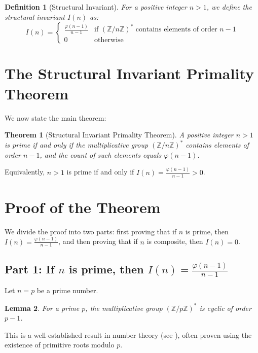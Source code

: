\documentclass[11pt,a4paper]{article}
\newtheorem{theorem}{Theorem}
\newtheorem{lemma}[theorem]{Lemma}
\newtheorem{definition}{Definition}
\newcommand{\Z}{\mathbb{Z}}
\newcommand{\ZnZstar}[1]{(\Z/{#1}\Z)^{*}}
\newcommand{\totient}{\varphi}
\newcommand{\structinv}{I}
\begin{document}
\begin{definition}[Structural Invariant]
For a positive integer $n > 1$, we define the structural invariant $\structinv(n)$ as:
\begin{equation}
\structinv(n) = 
\begin{cases}
\frac{\totient(n-1)}{n-1} & \text{if } \ZnZstar{n} \text{ contains elements of order } n-1 \\
0 & \text{otherwise}
\end{cases}
\end{equation}
\end{definition}

\section{The Structural Invariant Primality Theorem}

We now state the main theorem:

\begin{theorem}[Structural Invariant Primality Theorem]
A positive integer $n > 1$ is prime if and only if the multiplicative group $\ZnZstar{n}$ contains elements of order $n-1$, and the count of such elements equals $\totient(n-1)$.
\end{theorem}

Equivalently, $n > 1$ is prime if and only if $\structinv(n) = \frac{\totient(n-1)}{n-1} > 0$.

\section{Proof of the Theorem}

We divide the proof into two parts: first proving that if $n$ is prime, then $\structinv(n) = \frac{\totient(n-1)}{n-1}$, and then proving that if $n$ is composite, then $\structinv(n) = 0$.

\subsection{Part 1: If $n$ is prime, then $\structinv(n) = \frac{\totient(n-1)}{n-1}$}

Let $n = p$ be a prime number.

\begin{lemma}
For a prime $p$, the multiplicative group $\ZnZstar{p}$ is cyclic of order $p-1$.
\end{lemma}

This is a well-established result in number theory (see \cite{hardy}), often proven using the existence of primitive roots modulo $p$.
\end{document}
